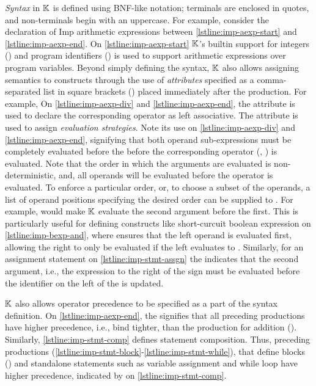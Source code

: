 \emph{Syntax} in $\mathbb{K}{}$ is defined using BNF-like notation; terminals are enclosed
in quotes, and non-terminals begin with an uppercase. For example,
consider the declaration of Imp arithmetic expressions between
\autoref{lstline:imp-aexp-start} and \autoref{lstline:imp-aexp-end}. On
\autoref{lstline:imp-aexp-start} $\mathbb{K}$'s builtin support
for integers () and program identifiers
() is used to support arithmetic expressions over program variables.
Beyond simply defining the syntax, $\mathbb{K}{}$ also allows assigning semantics to
constructs through the use of \emph{attributes} specified as a comma-separated list
in square brackets (\inlinek{[..]}) placed immediately after the \BNF{} production.
For example, On \autoref{lstline:imp-aexp-div} and \autoref{lstline:imp-aexp-end},
the attribute  is used to declare the
corresponding operator as left associative. The  attribute is used
to assign \emph{evaluation strategies}. Note its use
on \autoref{lstline:imp-aexp-div} and \autoref{lstline:imp-aexp-end}, signifying
that both operand sub-expressions must be completely evaluated before the
before the corresponding operator (\inlinek{/}, \inlinek{+}) is evaluated.
Note that the order in which the arguments are evaluated is non-deterministic,
and, all operands will be evaluated before the operator is evaluated.
To enforce a particular order, or, to choose a subset of the operands, a
list of operand positions specifying the desired order can be supplied to
. For example,  would make $\mathbb{K}$
evaluate the second argument before the first. This is particularly
useful for defining constructs like short-curcuit \inlineimp{&&} boolean
expression on \autoref{lstline:imp-bexp-and}, where 
ensures that the left operand is evaluated first, allowing the right to only
be evaluated if the left evaluates to .
Similarly, for an assignment statement on \autoref{lstline:imp-stmt-assgn}
the  indicates that the second argument, i.e., the
expression to the right of the \inlineimp{=} sign must be evaluated before
the identifier on the left of the \inlineimp{=} is updated.

$\mathbb{K}{}$ also allows operator precedence to be specified as a part of the
syntax definition. On \autoref{lstline:imp-aexp-end},
the \inlinek{>} signifies that all preceding productions have higher precedence,
i.e., bind tighter, than the production for addition (\inlinek{+}).
Similarly, \autoref{lstline:imp-stmt-comp} defines statement composition.
Thus, preceding  productions
(\autoref{lstline:imp-stmt-block}-\autoref{lstline:imp-stmt-while}), that define
blocks () and standalone statements such as variable assignment and
while loop have higher precedence, indicated by \inlinek{>} on \autoref{lstline:imp-stmt-comp}.

